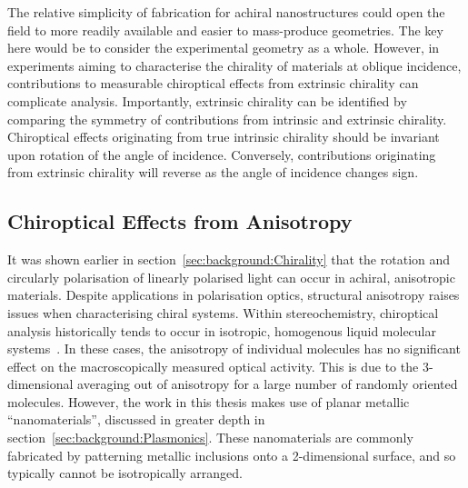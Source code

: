 The relative simplicity of fabrication for achiral nanostructures could open the field to more readily available and easier to mass-produce geometries. The key here would be to consider the experimental geometry as a whole. However, in experiments aiming to characterise the chirality of materials at oblique incidence, contributions to measurable chiroptical effects from extrinsic chirality can complicate analysis. Importantly, extrinsic chirality can be identified by comparing the symmetry of contributions from intrinsic and extrinsic chirality. Chiroptical effects originating from true intrinsic chirality should be invariant upon rotation of the angle of incidence. Conversely, contributions originating from extrinsic chirality will reverse as the angle of incidence changes sign.


\subsection{Chiroptical Effects from Anisotropy}\label{sec:background:Chirality:anisotropy}

It was shown earlier in section~\ref{sec:background:Chirality} that the rotation and circularly polarisation of linearly polarised light can occur in achiral, anisotropic materials.
Despite applications in polarisation optics, structural anisotropy raises issues when characterising chiral systems. 
Within stereochemistry, chiroptical analysis historically tends to occur in isotropic, homogenous liquid molecular systems~\cite{Berova2012a}. In these cases, the anisotropy of individual molecules has no significant effect on the macroscopically measured optical activity. This is due to the 3-dimensional averaging out of anisotropy for a large number of randomly oriented molecules. 
However, the work in this thesis makes use of planar metallic ``nanomaterials'', discussed in greater depth in section~\ref{sec:background:Plasmonics}. These nanomaterials are commonly fabricated by patterning metallic inclusions onto a 2-dimensional surface, and so typically cannot be isotropically arranged. 


